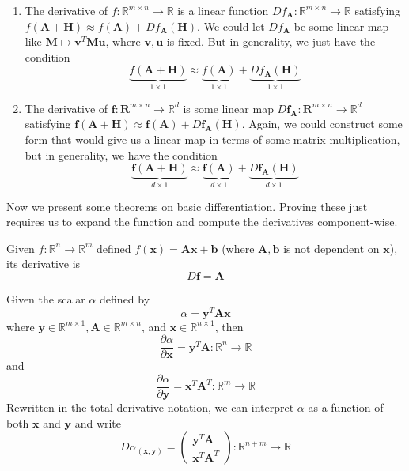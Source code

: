   \begin{enumerate}
    \item The derivative of $f: \mathbb{R}^{m \times n} \longrightarrow \mathbb{R}$ is a linear function $D f_{\mathbf{A}} : \mathbb{R}^{m \times n} \longrightarrow \mathbb{R}$ satisfying $f(\mathbf{A} + \mathbf{H}) \approx f(\mathbf{A}) + D f_{\mathbf{A}} (\mathbf{H})$. We could let $D f_{\mathbf{A}}$ be some linear map like $\mathbf{M} \mapsto \mathbf{v}^T \mathbf{M} \mathbf{u}$, where $\mathbf{v}, \mathbf{u}$ is fixed. But in generality, we just have the condition 
    \[\underbrace{f(\mathbf{A} + \mathbf{H})}_{1 \times 1} \approx \underbrace{f(\mathbf{A})}_{1 \times 1} + \underbrace{D f_{\mathbf{A}} (\mathbf{H})}_{1 \times 1}\]
    
    \item The derivative of $\mathbf{f}: \mathbf{R}^{m \times n} \longrightarrow \mathbb{R}^d$ is some linear map $D \mathbf{f}_\mathbf{A} : \mathbf{R}^{m \times n} \longrightarrow \mathbb{R}^d$ satisfying $\mathbf{f} (\mathbf{A} + \mathbf{H}) \approx \mathbf{f}(\mathbf{A}) + D \mathbf{f}_\mathbf{A} (\mathbf{H})$. Again, we could construct some form that would give us a linear map in terms of some matrix multiplication, but in generality, we have the condition 
    \[\underbrace{\mathbf{f} (\mathbf{A} + \mathbf{H})}_{d \times 1} \approx \underbrace{\mathbf{f}(\mathbf{A})}_{d \times 1} + \underbrace{D \mathbf{f}_\mathbf{A} (\mathbf{H})}_{d \times 1}\]
  \end{enumerate}

  Now we present some theorems on basic differentiation. Proving these just requires us to expand the function and compute the derivatives component-wise. 

  \begin{theorem}
  Given $f: \mathbb{R}^n \longrightarrow \mathbb{R}^m$ defined $f(\mathbf{x}) = \mathbf{A} \mathbf{x} + \mathbf{b}$ (where $\mathbf{A}, \mathbf{b}$ is not dependent on $\mathbf{x}$), its derivative is 
  \[D \mathbf{f} = \mathbf{A}\]
  \end{theorem}

  \begin{theorem}
  Given the scalar $\alpha$ defined by 
  \[\alpha = \mathbf{y}^T \mathbf{A} \mathbf{x}\]
  where $\mathbf{y} \in \mathbb{R}^{m \times 1}, \mathbf{A} \in \mathbb{R}^{m \times n}$, and $\mathbf{x} \in \mathbb{R}^{n \times 1}$, then 
  \[\frac{\partial \alpha}{\partial \mathbf{x}} = \mathbf{y}^T \mathbf{A} : \mathbb{R}^n \longrightarrow \mathbb{R}\]
  and 
  \[\frac{\partial \alpha}{\partial \mathbf{y}} = \mathbf{x}^T \mathbf{A}^T : \mathbb{R}^m \longrightarrow \mathbb{R}\]
  Rewritten in the total derivative notation, we can interpret $\alpha$ as a function of both $\mathbf{x}$ and $\mathbf{y}$ and write 
  \[D \alpha_{(\mathbf{x}, \mathbf{y})} = \begin{pmatrix} \mathbf{y}^T \mathbf{A} \\ \mathbf{x}^T \mathbf{A}^T \end{pmatrix} : \mathbb{R}^{n + m} \longrightarrow \mathbb{R}\]
  \end{theorem}

